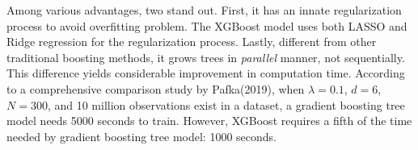 \documentclass[11pt,a4paper,oneside]{article}
\begin{document}
\par
Among various advantages, two stand out. First, it has an innate regularization process to avoid overfitting problem. The XGBoost model uses both LASSO and Ridge regression for the regularization process. Lastly, different from other traditional boosting methods, it grows trees in \emph{parallel} manner, not sequentially. This difference yields considerable improvement in computation time. According to a comprehensive comparison study by Pafka(2019)\cite{pafka}, when $\lambda=0.1$, $d=6$, $N=300$, and 10 million observations exist in a dataset, a gradient boosting tree model needs 5000 seconds to train. However, XGBoost requires a fifth of the time needed by gradient boosting tree model: 1000 seconds.
\end{document}
